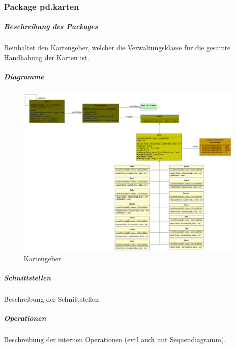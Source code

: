 \documentclass[a4paper,12pt,halfparskip,DIV14]{scrartcl}
\begin{document}
\subsubsection{Package pd.karten} %
\label{ssub:package_pd_karten}
\subparagraph{Beschreibung des Packages} %
\label{ssub:beschreibung_des_packages}
Beinhaltet den Kartengeber, welcher die Verwaltungsklasse für die gesamte Handhabung der Karten ist.
\subparagraph{Diagramme} %
\label{ssub:diagramme}
\begin{figure}
	[htp] \centering 
	\includegraphics[width=1\textwidth]{pd_kartengeber.png} \caption{Kartengeber}\label{fig:pd_kartengeber.png} 
\end{figure}
\subparagraph{Schnittstellen} %
\label{ssub:schnittstellen}
Beschreibung der Schnittstellen
\subparagraph{Operationen} %
\label{ssub:operationen}
Beschreibung der internen Operationen (evtl auch mit Sequendiagramm).

\clearpage
\end{document}
